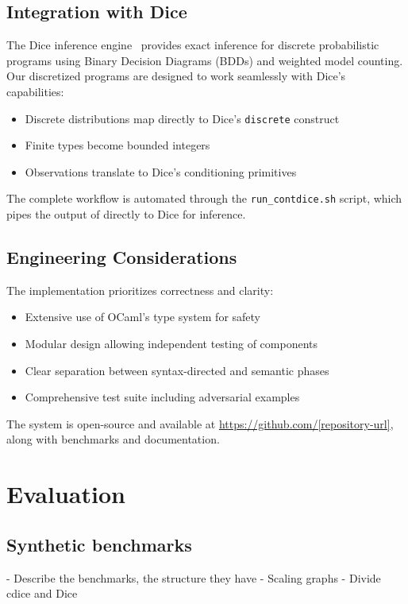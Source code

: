 \documentclass[acmsmall,screen,dvipsnames,x11names,nonacm,anonymous,review]{acmart}
\begin{document}
\subsection{Integration with Dice}

The Dice inference engine~\cite{Holtzen2020Dice} provides exact inference for discrete probabilistic programs using Binary Decision Diagrams (BDDs) and weighted model counting. Our discretized programs are designed to work seamlessly with Dice's capabilities:
\begin{itemize}
    \item Discrete distributions map directly to Dice's \texttt{discrete} construct
    \item Finite types become bounded integers
    \item Observations translate to Dice's conditioning primitives
\end{itemize}

The complete workflow is automated through the \texttt{run\_contdice.sh} script, which pipes the output of \Slice{} directly to Dice for inference.

\subsection{Engineering Considerations}

The implementation prioritizes correctness and clarity:
\begin{itemize}
    \item Extensive use of OCaml's type system for safety
    \item Modular design allowing independent testing of components
    \item Clear separation between syntax-directed and semantic phases
    \item Comprehensive test suite including adversarial examples
\end{itemize}

The system is open-source and available at \url{https://github.com/[repository-url]}, along with benchmarks and documentation.


\section{Evaluation}\label{sec:evaluation}


\subsection{Synthetic benchmarks}\label{sec:synthetic-benchmarks}
- Describe the benchmarks, the structure they have
- Scaling graphs
- Divide cdice and Dice
\end{document}
